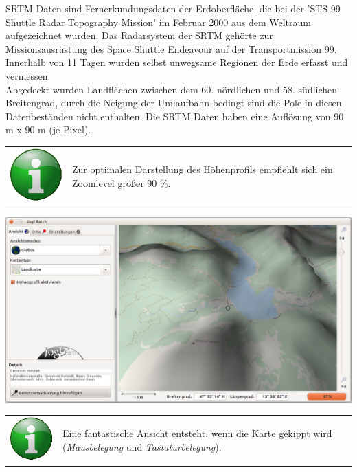\documentclass[10pt]{scrreprt}
\newcommand{\textref}[1]{\mbox{\raisebox{0.1ex}{\small$\rightarrow$ }\textit{#1}}}
\begin{document}
SRTM Daten sind Fernerkundungsdaten der Erdoberfläche, die bei der 'STS-99 Shuttle Radar Topography Mission' im Februar 2000 aus dem Weltraum aufgezeichnet wurden. Das Radarsystem der SRTM gehörte zur Missionsausrüstung des Space Shuttle Endeavour auf der Transportmission 99. Innerhalb von 11 Tagen wurden selbst unwegsame Regionen der Erde erfasst und vermessen.\\

Abgedeckt wurden Landflächen zwischen dem 60. nördlichen und 58. südlichen Breitengrad, durch die Neigung der Umlaufbahn bedingt sind die Pole in diesen Datenbeständen nicht enthalten. Die SRTM Daten haben eine Auflösung von 90 m x 90 m (je Pixel).

\vspace{3mm}
\begin{tabular}{>{\centering \arraybackslash}m{1cm} m{14cm}}
\includegraphics[scale=0.5]{images/info.eps} &  Zur optimalen Darstellung des Höhenprofils empfiehlt sich ein Zoomlevel größer 90 \%. \\ 
\end{tabular} 

\vspace{3mm}
\begin{center}
\includegraphics[scale=0.25]{images/heightmap1.png}
\end{center}


\vspace{3mm}
\begin{tabular}{>{\centering \arraybackslash}m{1cm} m{14cm}}
\includegraphics[scale=0.5]{images/info.eps} &  Eine fantastische Ansicht entsteht, wenn die Karte gekippt wird (\textref{Mausbelegung} und \textref{Tastaturbelegung}). \\ 
\end{tabular} 
\end{document}
